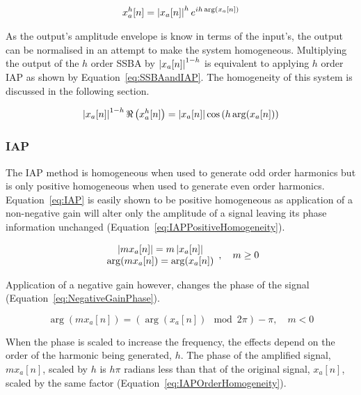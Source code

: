 			\begin{gather}
				x_{a}^{h}[n] = \left|x_{a}[n]\right|^{h} e^{ih\arg (x_{a}[n])}
				\label{eq:PolarSSBA}
			\end{gather}

			As the output's amplitude envelope is know in terms of the input's, the output can be normalised in
			an attempt to make the system homogeneous. Multiplying the output of the $h$ order SSBA
			by $\left|x_{a}[n]\right|^{1-h}$ is equivalent to applying $h$ order IAP as shown by
			Equation~\ref{eq:SSBAandIAP}. The homogeneity of this system is discussed in the following section.

			\begin{equation}
				\left|x_{a}[n]\right|^{1-h} \Re \left( x_{a}^{h}[n] \right) = 
				\left|x_{a}[n]\right| \cos \left( h\arg(x_{a}[n]) \right)
				\label{eq:SSBAandIAP}
			\end{equation}

		\subsubsection*{IAP}
			The IAP method is homogeneous when used to generate odd order harmonics but is only positive
			homogeneous when used to generate even order harmonics. Equation~\ref{eq:IAP} is easily shown to be
			positive homogeneous as application of a non-negative gain will alter only the amplitude of a
			signal leaving its phase information unchanged (Equation~\ref{eq:IAPPositiveHomogeneity}).

			\begin{equation}
				\begin{array}{c}
					\left|mx_{a}[n]\right| = m\left|x_{a}[n]\right| \\
					\arg(mx_{a}[n]) = \arg(x_{a}[n])
				\end{array}
				, \quad m \geq 0
				\label{eq:IAPPositiveHomogeneity}
			\end{equation}

			Application of a negative gain however, changes the phase of the signal
			(Equation~\ref{eq:NegativeGainPhase}).
						
			\begin{equation}
				\arg(mx_{a}[n]) = (\arg(x_{a}[n]) \mod 2\pi) - \pi, \quad m < 0
				\label{eq:NegativeGainPhase}
			\end{equation}

			When the phase is scaled to increase the frequency, the effects depend on the order of the harmonic
			being generated, $h$. The phase of the amplified signal, $mx_{a}[n]$, scaled by $h$ is $h\pi$
			radians less than that of the original signal, $x_{a}[n]$, scaled by the same factor
			(Equation~\ref{eq:IAPOrderHomogeneity}).


